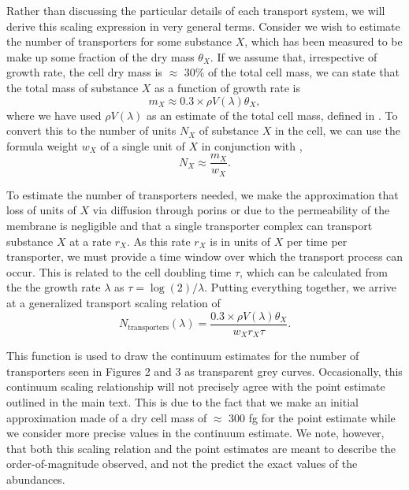 Rather than discussing the particular details of each transport system, we will
derive this scaling expression in very general terms. Consider we wish to
estimate the number of transporters for some substance $X$, which has been
measured to be make up some fraction of the dry mass $\theta_X$. If we assume
that, irrespective of growth rate, the cell dry mass is $\approx$ 30\% of the
total cell mass, we can state that the total mass of substance $X$ as a function
of growth rate is
\begin{equation}
m_X \approx 0.3 \times \rho V(\lambda) \theta_X,
\label{eq:m_x}
\end{equation}
where we have used $\rho V(\lambda)$ as an estimate of the total cell mass,
defined in . To convert this to the number of units $N_X$ of substance
$X$ in the cell, we can use the formula weight $w_X$ of a single unit of $X$ in
conjunction with ,
\begin{equation}
    N_X \approx \frac{m_X}{w_X}.
    \label{eq:n_x}
\end{equation}

To estimate the number of transporters needed, we make the approximation that
loss of units of $X$ via diffusion through porins or due to the permeability of
the membrane is negligible  and that a single transporter complex can transport
substance $X$ at a rate $r_X$. As this rate $r_X$  is in units of $X$ per time
per transporter, we must provide a time window over which the transport process
can occur. This is related to the cell doubling time $\tau$, which can be
calculated from the the growth rate $\lambda$ as $\tau = \log(2) / \lambda$.
Putting everything together, we arrive at a generalized transport scaling
relation of
\begin{equation}
N_\text{transporters}(\lambda) = \frac{0.3 \times \rho V(\lambda)\theta_X}{w_X r_X \tau}.
\label{eq:transporter_continuum}
\end{equation}

This function is used to draw the continuum estimates for the number of
transporters seen in Figures 2 and 3 as transparent grey curves. Occasionally,
this continuum scaling relationship will not precisely agree with the point
estimate outlined in the main text. This is due to the fact that we make  an
initial approximation made of a dry cell mass of $\approx$ 300 fg for the point
estimate while we consider more precise values in the continuum estimate. We
note, however, that both this scaling relation and the point estimates are meant
to describe the order-of-magnitude observed, and not the predict the exact
values of the abundances.

